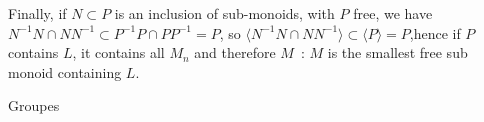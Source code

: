 \documentclass[a4paper,11pt]{exam}
\newcommand{\Z}{\mathbb{Z}}
\newcommand{\N}{\mathbb{N}}
\begin{document}
\begin{questions}
\begin{enumerate}
\begin{solution}
		Finally, if $N \subset P$ is an inclusion of sub-monoids, with $P$ free, we have $N^{-1}N \cap NN^{-1} \subset P^{-1}P \cap PP^{-1} = P$, so $\langle N^{-1}N \cap NN^{-1} \rangle \subset \langle P \rangle = P$,hence if $P$ contains $L$, it contains all $M_n$ and therefore
		$M$~: $M$ is the smallest free sub monoid containing $L$.
	\end{solution}
\end{enumerate}


 \begin{EnvFullwidth}
	\colorbox{gris}{
		\begin{minipage}[c]{\textwidth}
			Groupes
		\end{minipage}
	}
\end{EnvFullwidth}



%
%
%
%		
%			
%				
%		

\end{questions}
\end{document}
